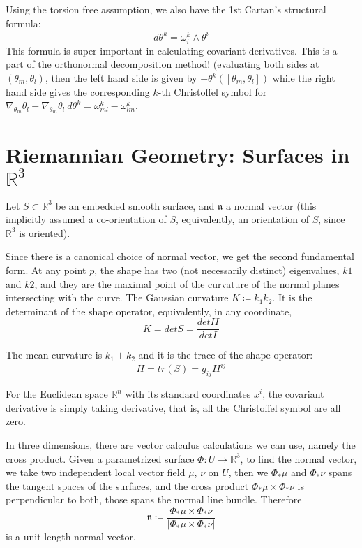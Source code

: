 \documentclass[main.tex]{subfiles}
\begin{document}
Using the torsion free assumption, we also have the 1st Cartan's structural formula:
$$
d\theta^k = \omega_i ^k \wedge \theta^i
$$
This formula is super important in calculating covariant derivatives. This is a part of the orthonormal decomposition method!
(evaluating both sides at $(\theta_m, \theta_l)$, then the left hand side is given by $-\theta^k([\theta_m, \theta_l])$ while the right hand side gives the corresponding $k$-th Christoffel symbol for $\nabla_{\theta_m} \theta_l - \nabla_{\theta_m}\theta_l \ d\theta^k= \omega^k _{ml} - \omega^k _{lm}$.

\section{Riemannian Geometry: Surfaces in $\mathbb{R}^3$}

Let $S \subset \mathbb{R}^3$ be an embedded smooth surface, and $\mathfrak{n}$ a normal vector (this implicitly assumed a co-orientation of $S$, equivalently, an orientation of $S$, since $\mathbb{R}^3$ is oriented).

Since there is a canonical choice of normal vector, we get the second fundamental form. At any point $p$, the shape has two (not necessarily distinct) eigenvalues, $k1$ and $k2$, and they are the maximal point of the curvature of the normal planes intersecting with the curve. The Gaussian curvature $K \coloneqq k_1 k_2$. It is the determinant of the shape operator, equivalently, in any coordinate, 
$$
K = det S = \frac{det II}{det I}
$$

The mean curvature is $k_1 + k_2$ and it is the trace of the shape operator:
$$
H = tr(S) = g_{ij} II^{ij}
$$

For the Euclidean space $\mathbb{R}^n$ with its standard coordinates $x^i$, the covariant derivative is simply taking derivative, that is, all the Christoffel symbol are all zero.

In three dimensions, there are vector calculus calculations we can use, namely the cross product. Given a parametrized surface $\Phi: U \rightarrow \mathbb{R}^3$, to find the normal vector, we take two independent local vector field $\mu$, $\nu$ on $U$, then we $\Phi_* {\mu}$ and $\Phi_* \nu$ spans the tangent spaces of the surfaces, and the cross product $\Phi_* \mu \times \Phi_* \nu$ is perpendicular to both, those spans the normal line bundle. Therefore 
$$
\mathfrak{n} \coloneqq \frac{\Phi_* \mu \times \Phi_* \nu}{|\Phi_* \mu \times \Phi_* \nu|}
$$
is a unit length normal vector. 
\end{document}
